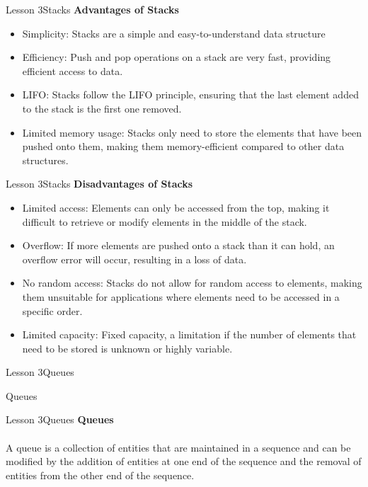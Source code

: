 \documentclass[aspectratio=1610]{beamer}
\begin{document}
\begin{frame}{Lesson 3}{Stacks}
\LARGE
\textbf{Advantages of Stacks}\\
\Large
\begin{itemize}
\item Simplicity: Stacks are a simple and easy-to-understand data structure
\item Efficiency: Push and pop operations on a stack are very fast, providing efficient access to data.
\item LIFO: Stacks follow the LIFO principle, ensuring that the last element added to the stack is the first one removed.
\item Limited memory usage: Stacks only need to store the elements that have been pushed onto them, making them memory-efficient compared to other data structures.
\end{itemize}
\end{frame}



\begin{frame}{Lesson 3}{Stacks}
\LARGE
\textbf{Disadvantages of Stacks}\\
\Large
\begin{itemize}
\item Limited access: Elements can only be accessed from the top, making it difficult to retrieve or modify elements in the middle of the stack.
\item Overflow: If more elements are pushed onto a stack than it can hold, an overflow error will occur, resulting in a loss of data.
\item No random access: Stacks do not allow for random access to elements, making them unsuitable for applications where elements need to be accessed in a specific order.
\item Limited capacity: Fixed capacity, a limitation if the number of elements that need to be stored is unknown or highly variable.
\end{itemize}
\end{frame}



\begin{frame}{Lesson 3}{Queues}
\begin{center}
\Huge Queues
\end{center}
\end{frame}


\begin{frame}{Lesson 3}{Queues}
\LARGE
\textbf{Queues}\\~\\
A queue is a collection of entities that are maintained in
a sequence and can be modified by the addition of entities at one
end of the sequence and the removal of entities from the other end
of the sequence. 
\end{frame}
\end{document}
